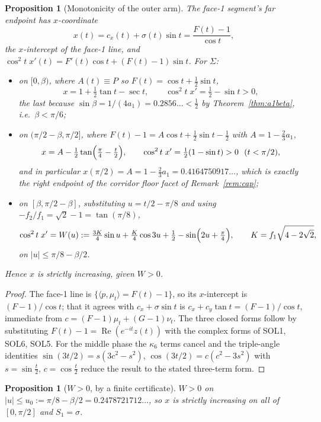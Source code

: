 \documentclass[11pt]{article}
\newtheorem{proposition}[theorem]{Proposition}
\theoremstyle{definition}
\newcommand{\Sig}{\Sigma}
\begin{document}
\begin{proposition}[Monotonicity of the outer arm]\label{prop:mono}
The face-1 segment's far endpoint has $x$-coordinate
\begin{equation}\label{eq:xint}
  x(t)=c_x(t)+\sigma(t)\sin t=\frac{F(t)-1}{\cos t},
\end{equation}
the $x$-intercept of the face-1 line, and $\cos^2t\;x'(t)=F'(t)\cos t+(F(t)-1)\sin t$.
For $\Sig$:
\begin{itemize}
\item on $[0,\beta)$, where $A(t)\equiv P$ so $F(t)=\cos t+\tfrac12\sin t$,
\[
  x=1+\tfrac12\tan t-\sec t,\qquad \cos^2t\;x'=\tfrac12-\sin t>0,
\]
the last because $\sin\beta=1/(4a_1)=0.2856\ldots<\tfrac12$ by
Theorem~\ref{thm:a1beta}, i.e.\ $\beta<\pi/6$;
\item on $(\pi/2-\beta,\pi/2]$, where $F(t)-1=A\cos t+\tfrac12\sin t-\tfrac12$ with
$A=1-\tfrac23a_1$,
\[
  x=A-\tfrac12\tan\Bigl(\tfrac\pi4-\tfrac t2\Bigr),\qquad
  \cos^2t\;x'=\tfrac12(1-\sin t)>0\ \ (t<\pi/2),
\]
and in particular $x(\pi/2)=A=1-\tfrac23a_1=0.4164750917\ldots$, which is exactly the
right endpoint of the corridor floor facet of Remark~\ref{rem:cap};
\item on $[\beta,\pi/2-\beta]$, substituting $u=t/2-\pi/8$ and using
$-f_2/f_1=\sqrt2-1=\tan(\pi/8)$,
\[
  \cos^2t\;x'=W(u):=\tfrac{3K}{4}\sin u+\tfrac K4\cos3u+\tfrac12
    -\sin\Bigl(2u+\tfrac\pi4\Bigr),\qquad K=f_1\sqrt{4-2\sqrt2},
\]
on $|u|\le\pi/8-\beta/2$.
\end{itemize}
Hence $x$ is strictly increasing, given $W>0$.
\end{proposition}

\begin{proof}
The face-1 line is $\{\langle p,\mu_t\rangle=F(t)-1\}$, so its $x$-intercept is
$(F-1)/\cos t$; that it agrees with $c_x+\sigma\sin t$ is
$c_x+c_y\tan t=(F-1)/\cos t$, immediate from $c=(F-1)\mu_t+(G-1)\nu_t$. The three
closed forms follow by substituting $F(t)-1=\operatorname{Re}(e^{-it}z(t))$ with the
complex forms of SOL1, SOL6, SOL5. For the middle phase the $\kappa_6$ terms cancel and
the triple-angle identities $\sin(3t/2)=s(3c^2-s^2)$, $\cos(3t/2)=c(c^2-3s^2)$ with
$s=\sin\tfrac t2$, $c=\cos\tfrac t2$ reduce the result to the stated three-term form.
\end{proof}

\begin{proposition}[$W>0$, by a finite certificate]\label{prop:W}
$W>0$ on $|u|\le u_0:=\pi/8-\beta/2=0.2478721712\ldots$, so $x$ is strictly increasing
on all of $[0,\pi/2]$ and $S_1=\sigma$.
\end{proposition}
\end{document}
